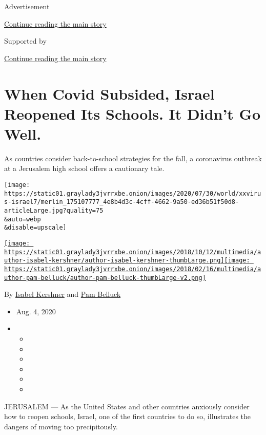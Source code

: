 Advertisement

\protect\hyperlink{after-top}{Continue reading the main story}

Supported by

\protect\hyperlink{after-sponsor}{Continue reading the main story}

\hypertarget{when-covid-subsided-israel-reopened-its-schools-it-didnt-go-well}{%
\section{When Covid Subsided, Israel Reopened Its Schools. It Didn't Go
Well.}\label{when-covid-subsided-israel-reopened-its-schools-it-didnt-go-well}}

As countries consider back-to-school strategies for the fall, a
coronavirus outbreak at a Jerusalem high school offers a cautionary
tale.

\texttt{[image: https://static01.graylady3jvrrxbe.onion/images/2020/07/30/world/xxvirus-israel7/merlin\_175107777\_4e8b4d3c-4cff-4662-9a50-ed36b51f50d8-articleLarge.jpg?quality=75\\\&auto=webp\\\&disable=upscale]}

\href{https://www.nytimes3xbfgragh.onion/by/isabel-kershner}{\texttt{[image: https://static01.graylady3jvrrxbe.onion/images/2018/10/12/multimedia/author-isabel-kershner/author-isabel-kershner-thumbLarge.png]}}\href{https://www.nytimes3xbfgragh.onion/by/pam-belluck}{\texttt{[image: https://static01.graylady3jvrrxbe.onion/images/2018/02/16/multimedia/author-pam-belluck/author-pam-belluck-thumbLarge-v2.png]}}

By \href{https://www.nytimes3xbfgragh.onion/by/isabel-kershner}{Isabel
Kershner} and
\href{https://www.nytimes3xbfgragh.onion/by/pam-belluck}{Pam Belluck}

\begin{itemize}
\item
  Aug. 4, 2020
\item
  \begin{itemize}
  \item
  \item
  \item
  \item
  \item
  \item
  \end{itemize}
\end{itemize}

JERUSALEM --- As the United States and other countries anxiously
consider how to reopen schools, Israel, one of the first countries to do
so, illustrates the dangers of moving too precipitously.

